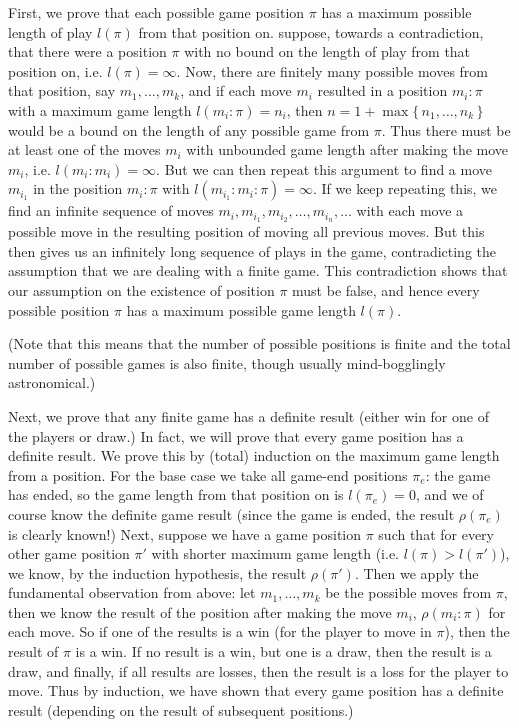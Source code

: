 \documentclass[10pt,dvipdfmx]{report}
\begin{document}
First, we prove that each possible game position $\pi$ has a maximum
possible length of play $l(\pi)$ from that position on.
suppose, towards a contradiction, that there were a position $\pi$ with no bound on the length
of play from that position on, {i.e.} $l(\pi)=\infty$.  Now, there are finitely many possible moves
from that position, say $m_1, \dots, m_k$, and if each move $m_i$ resulted
in a position $m_i:\pi$ with a maximum game length $l(m_i:\pi)=n_i$,
then $n=1+\max\{\,n_1,\dots,n_k\,\}$ would be a bound on the length of
any possible game from $\pi$.  Thus there must be at least one of the 
moves $m_i$ with unbounded game length after making the move $m_i$,
{i.e.} $l(m_i:m_i) = \infty$.
But we can then repeat this argument to find a move $m_{i_1}$ in the
position $m_i:\pi$ with $l(m_{i_1}:m_i:\pi)=\infty$.  If we keep repeating
this, we find an infinite sequence of moves
$m_i, m_{i_1}, m_{i_2}, \dots, m_{i_n}, \dots$ 
with each move a possible move in the resulting position of moving
all previous moves.  But this then gives us an infinitely long sequence of
plays in the game, contradicting the assumption that we are dealing with a finite game.
This contradiction shows that our assumption on the existence of position $\pi$ must be false,
and hence every possible position $\pi$ has a maximum possible game length $l(\pi)$.

(Note that this means that the number of possible
positions is finite and the total number of possible games is also finite, though
usually mind-bogglingly astronomical.)

Next, we prove that any finite game has a definite result
(either win for one of the players or draw.)  In fact, we will prove that every game
position has a definite result.  We prove this by (total) induction on the maximum game
length from a position.  For the base case we take all game-end positions $\pi_{e}$:
the game has ended, so the game length from that position on is $l(\pi_e)=0$, and we of course
know the definite game result (since the game is ended, the result $\rho(\pi_e)$ is clearly known!)
Next, suppose we have a game position $\pi$ such that for every other game position $\pi'$
with shorter maximum game length ({i.e.} $l(\pi)>l(\pi')$),
we know, by the induction hypothesis, the result $\rho(\pi')$.  Then we apply the fundamental
observation from above: let $m_1, \dots, m_k$ be the possible moves from $\pi$, then
we know the result of the position after making the move $m_i$, $\rho(m_i:\pi)$ for each move.
So if one of the results is a win (for the player to move in $\pi$), then the result of
$\pi$ is a win.  If no result is a win, but one is a draw, then the result is a draw,
and finally, if all results are losses, then the result is a loss for the player to move.
Thus by induction, we have shown that every game position has a definite result (depending on
the result of subsequent positions.)
\end{document}
